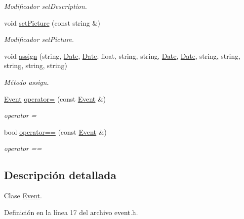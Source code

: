 \begin{DoxyCompactItemize}
\begin{DoxyCompactList}\small\item\em Modificador set\+Description. \end{DoxyCompactList}\item 
void \hyperlink{class_event_a34bc506292fa3f27e1bd2adf5e8f5032}{set\+Picture} (const string \&)\hypertarget{class_event_a34bc506292fa3f27e1bd2adf5e8f5032}{}\label{class_event_a34bc506292fa3f27e1bd2adf5e8f5032}

\begin{DoxyCompactList}\small\item\em Modificador set\+Picture. \end{DoxyCompactList}\item 
void \hyperlink{class_event_a114abce3ab2a010cdd29eb6765ddc148}{assign} (string, \hyperlink{class_date}{Date}, \hyperlink{class_date}{Date}, float, string, string, \hyperlink{class_date}{Date}, \hyperlink{class_date}{Date}, string, string, string, string, string)\hypertarget{class_event_a114abce3ab2a010cdd29eb6765ddc148}{}\label{class_event_a114abce3ab2a010cdd29eb6765ddc148}

\begin{DoxyCompactList}\small\item\em Método assign. \end{DoxyCompactList}\item 
\hyperlink{class_event}{Event} \hyperlink{class_event_aa1f38079195c338a7628867d56cf9196}{operator=} (const \hyperlink{class_event}{Event} \&)
\begin{DoxyCompactList}\small\item\em operator = \end{DoxyCompactList}\item 
bool \hyperlink{class_event_a7501855e91a75bb9aac345ccdc0d1e2f}{operator==} (const \hyperlink{class_event}{Event} \&)
\begin{DoxyCompactList}\small\item\em operator == \end{DoxyCompactList}\end{DoxyCompactItemize}


\subsection{Descripción detallada}
Clase \hyperlink{class_event}{Event}. 

Definición en la línea 17 del archivo event.\+h.



